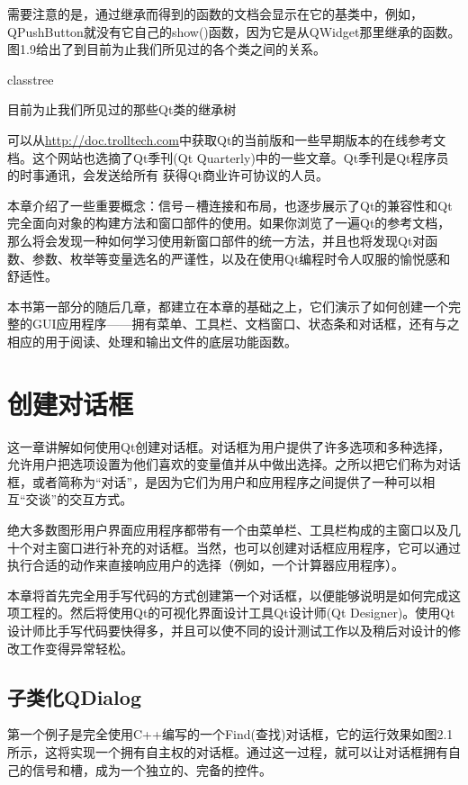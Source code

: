 \documentclass[11pt,oneside]{book}
\begin{document}
\begin{common-format}
需要注意的是，通过继承而得到的函数的文档会显示在它的基类中，例如，QPushButton就没有它自己的show()函数，因为它是从QWidget那里继承的函数。图1.9给出了到目前为止我们所见过的各个类之间的关系。
\begin{linefig}[0.8]{classtree}
\caption{目前为止我们所见过的那些Qt类的继承树}
\label{fig:classtree}
\end{linefig}

可以从\href{http://doc.trolltech.com}{http://doc.trolltech.com}中获取Qt的当前版和一些早期版本的在线参考文档。这个网站也选摘了Qt季刊(Qt Quarterly)中的一些文章。Qt季刊是Qt程序员的时事通讯，会发送给所有
获得Qt商业许可协议的人员。

本章介绍了一些重要概念：信号－槽连接和布局，也逐步展示了Qt的兼容性和Qt完全面向对象的构建方法和窗口部件的使用。如果你浏览了一遍Qt的参考文档，那么将会发现一种如何学习使用新窗口部件的统一方法，并且也将发现Qt对函数、参数、枚举等变量选名的严谨性，以及在使用Qt编程时令人叹服的愉悦感和舒适性。

本书第一部分的随后几章，都建立在本章的基础之上，它们演示了如何创建一个完整的GUI应用程序——拥有菜单、工具栏、文档窗口、状态条和对话框，还有与之相应的用于阅读、处理和输出文件的底层功能函数。



\chapter{创建对话框}
这一章讲解如何使用Qt创建对话框。对话框为用户提供了许多选项和多种选择，允许用户把选项设置为他们喜欢的变量值并从中做出选择。之所以把它们称为对话框，或者简称为“对话”，是因为它们为用户和应用程序之间提供了一种可以相互“交谈”的交互方式。

绝大多数图形用户界面应用程序都带有一个由菜单栏、工具栏构成的主窗口以及几十个对主窗口进行补充的对话框。当然，也可以创建对话框应用程序，它可以通过执行合适的动作来直接响应用户的选择（例如，一个计算器应用程序）。

本章将首先完全用手写代码的方式创建第一个对话框，以便能够说明是如何完成这项工程的。然后将使用Qt的可视化界面设计工具Qt设计师(Qt Designer)。使用Qt设计师比手写代码要快得多，并且可以使不同的设计测试工作以及稍后对设计的修改工作变得异常轻松。


\section{子类化QDialog}
第一个例子是完全使用C++编写的一个Find(查找)对话框，它的运行效果如图2.1所示，这将实现一个拥有自主权的对话框。通过这一过程，就可以让对话框拥有自己的信号和槽，成为一个独立的、完备的控件。


\end{common-format}
\end{document}
